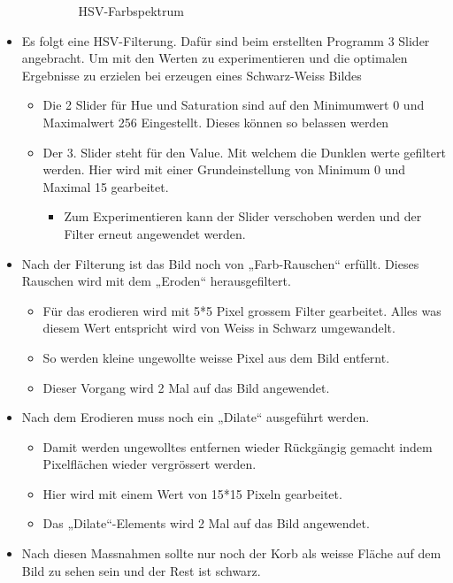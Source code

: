 \begin{itemize}
\begin{itemize}
\begin{figure}[h!]
            \caption{HSV-Farbspektrum}
            \label{fig:HSV-Farbspektrum}
        \end{figure}
    \end{itemize}
    \item Es folgt eine HSV-Filterung. Dafür sind beim erstellten Programm 3 
        Slider angebracht. Um mit den Werten zu experimentieren und die 
        optimalen Ergebnisse zu erzielen bei erzeugen eines Schwarz-Weiss Bildes
    \begin{itemize}
        \item Die 2 Slider für Hue und Saturation sind auf den Minimumwert 0 
            und Maximalwert 256 Eingestellt. Dieses können so belassen werden
        \item Der 3. Slider steht für den Value. Mit welchem die Dunklen werte 
            gefiltert werden. Hier wird mit einer Grundeinstellung von Minimum 
            0 und Maximal 15 gearbeitet.
        \begin{itemize}
            \item Zum Experimentieren kann der Slider verschoben werden und 
                der Filter erneut angewendet werden.
        \end{itemize}
    \end{itemize}
    \item Nach der Filterung ist das Bild noch von „Farb-Rauschen“ erfüllt. 
        Dieses Rauschen wird mit dem „Eroden“ herausgefiltert.
    \begin{itemize}
        \item Für das erodieren wird mit 5*5 Pixel grossem Filter gearbeitet. 
            Alles was diesem Wert entspricht wird von Weiss in Schwarz 
            umgewandelt.
        \item So werden kleine ungewollte weisse Pixel aus dem Bild entfernt.
        \item Dieser Vorgang wird 2 Mal auf das Bild angewendet.
    \end{itemize}
    \item Nach dem Erodieren muss noch ein „Dilate“ ausgeführt werden.
    \begin{itemize}
        \item Damit werden ungewolltes entfernen wieder Rückgängig gemacht 
            indem Pixelflächen wieder vergrössert werden.
        \item Hier wird mit einem Wert von 15*15 Pixeln gearbeitet.
        \item Das „Dilate“-Elements wird 2 Mal auf das Bild angewendet.
    \end{itemize}
    \item Nach diesen Massnahmen sollte nur noch der Korb als weisse Fläche 
        auf dem Bild zu sehen sein und der Rest ist schwarz.
\end{itemize}

